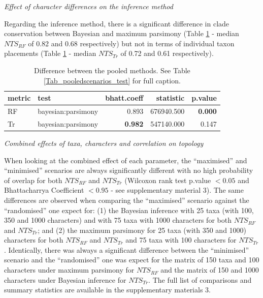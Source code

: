 \documentclass[12pt,letterpaper]{article}
\renewcommand{\subsection}[1]{%
\bigskip
\begin{center}
\begin{large}
\normalfont\itshape #1
\end{large}
\end{center}}
\begin{document}
\subsection{Effect of character differences on the inference method}

Regarding the inference method, there is a significant difference in clade conservation between Bayesian and maximum parsimony (Table \ref{Tab_pooledsmethods_test} - median $NTS_{RF}$ of 0.82 and 0.68 respectively) but not in terms of individual taxon placements (Table \ref{Tab_pooledsmethods_test} - median $NTS_{Tr}$ of 0.72 and 0.61 respectively).

\begin{table}[ht]
\centering
\begin{tabular}{llrrr}
  \hline
metric & test & bhatt.coeff & statistic & p.value \\ 
  \hline
RF & bayesian:parsimony & 0.893 & 676940.500 & \textbf{0.000} \\ 
Tr & bayesian:parsimony & \textbf{0.982} & 547140.000 & 0.147 \\ 
   \hline
\end{tabular}
\caption{Difference between the pooled methods. See Table \ref{Tab_pooledscenarios_test} for full caption.} 
\label{Tab_pooledsmethods_test}
\end{table}

\subsection{Combined effects of taxa, characters and correlation on topology}

When looking at the combined effect of each parameter, the ``maximised'' and ``minimised'' scenarios are always significantly different with no high probability of overlap for both $NTS_{RF}$ and $NTS_{Tr}$ (Wilcoxon rank test p.value $<0.05$ and Bhattacharrya Coefficient $<0.95$ - see supplementary material 3).
The same differences are observed when comparing the ``maximised'' scenario against the ``randomised'' one expect for: (1) the Bayesian inference with 25 taxa (with 100, 350 and 1000 characters) and with 75 taxa with 1000 characters for both $NTS_{RF}$ and $NTS_{Tr}$; and (2) the maximum parsimony for 25 taxa (with 350 and 1000) characters for both $NTS_{RF}$ and $NTS_{Tr}$ and 75 taxa with 100 characters for $NTS_{Tr}$.
Identically, there was always a significant difference between the ``minimised'' scenario and the ``randomised'' one was expect for the matrix of 150 taxa and 100 characters under maximum parsimony for $NTS_{RF}$ and the matrix of 150 and 1000 characters under Bayesian inference for $NTS_{Tr}$.
The full list of comparisons and summary statistics are available in the supplementary materials 3.
\end{document}
